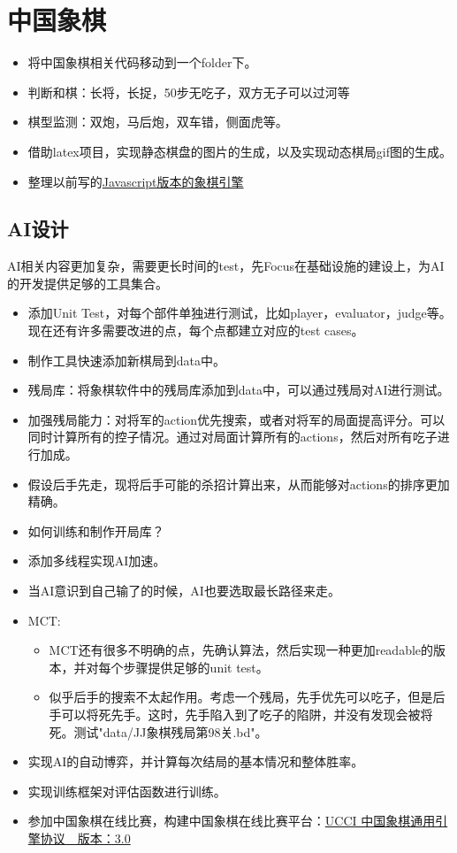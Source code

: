 \documentclass[export, 12pt, letterpaper]{ctexrep}
\begin{document}
\section{中国象棋}


\begin{itemize}
\item{ 将中国象棋相关代码移动到一个folder下。 }
\item{ 判断和棋：长将，长捉，50步无吃子，双方无子可以过河等 }
\item{ 棋型监测：双炮，马后炮，双车错，侧面虎等。 }
\item{ 借助latex项目，实现静态棋盘的图片的生成，以及实现动态棋局gif图的生成。 }
\item{ 整理以前写的\href{https://github.com/JimmyFromSYSU/ChineseChess}{Javascript版本的象棋引擎} }
\end{itemize}


\subsection{AI设计}

AI相关内容更加复杂，需要更长时间的test，先Focus在基础设施的建设上，为AI的开发提供足够的工具集合。


\begin{itemize}
\item{ 添加Unit Test，对每个部件单独进行测试，比如player，evaluator，judge等。现在还有许多需要改进的点，每个点都建立对应的test cases。 }
\item{ 制作工具快速添加新棋局到data中。 }
\item{ 残局库：将象棋软件中的残局库添加到data中，可以通过残局对AI进行测试。 }
\item{ 加强残局能力：对将军的action优先搜索，或者对将军的局面提高评分。可以同时计算所有的控子情况。通过对局面计算所有的actions，然后对所有吃子进行加成。 }
\item{ 假设后手先走，现将后手可能的杀招计算出来，从而能够对actions的排序更加精确。 }
\item{ 如何训练和制作开局库？ }
\item{ 添加多线程实现AI加速。 }
\item{ 当AI意识到自己输了的时候，AI也要选取最长路径来走。 }
\item{ MCT:
\begin{itemize}
\item{ MCT还有很多不明确的点，先确认算法，然后实现一种更加readable的版本，并对每个步骤提供足够的unit test。 }
\item{ 似乎后手的搜索不太起作用。考虑一个残局，先手优先可以吃子，但是后手可以将死先手。这时，先手陷入到了吃子的陷阱，并没有发现会被将死。测试"data/JJ象棋残局第98关.bd"。 }
\end{itemize}
 }
\item{ 实现AI的自动博弈，并计算每次结局的基本情况和整体胜率。 }
\item{ 实现训练框架对评估函数进行训练。 }
\item{ 参加中国象棋在线比赛，构建中国象棋在线比赛平台：\href{https://www.xqbase.com/protocol/cchess_ucci.htm}{UCCI 中国象棋通用引擎协议　版本：3.0} }
\end{itemize}
\end{document}
